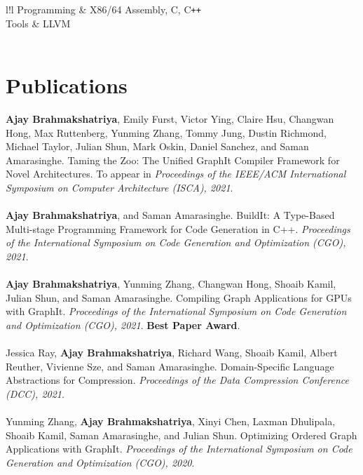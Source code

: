 \documentclass[10pt]{article}
\newcommand{\textbfx}[1]{{\bf #1}}
\newcommand{\textitx}[1]{{\it #1}}
\newcommand \VRule{}
\begin{document}
\begin{tabular}{l!{\VRule}l}
Programming		&	X86/64 Assembly, C, C\texttt{++}\\
Tools			&	LLVM\\
 \\
\end{tabular}

\section*{Publications}
\textbfx{Ajay Brahmakshatriya}, Emily Furst, Victor Ying, Claire Hsu, Changwan Hong, Max Ruttenberg, Yunming Zhang, Tommy Jung, Dustin Richmond, Michael Taylor, Julian Shun, Mark Oskin, Daniel Sanchez, and Saman Amarasinghe. Taming the Zoo: The Unified GraphIt Compiler Framework for Novel Architectures. To appear in \textitx{Proceedings of the IEEE/ACM International Symposium on Computer Architecture (ISCA), 2021}.
\\ \\
\textbfx{Ajay Brahmakshatriya}, and Saman Amarasinghe. BuildIt: A Type-Based Multi-stage Programming Framework for Code Generation in C++. 
\textitx{Proceedings of the International Symposium on Code Generation and Optimization (CGO), 2021}.
\\ \\
\textbfx{Ajay Brahmakshatriya}, Yunming Zhang, Changwan Hong, Shoaib Kamil, Julian Shun, and Saman Amarasinghe. Compiling Graph Applications for GPUs with GraphIt. 
\textitx{Proceedings of the International Symposium on Code Generation and Optimization (CGO), 2021}. \textbfx{Best Paper Award}. 
\\ \\
Jessica Ray, \textbfx{Ajay Brahmakshatriya}, Richard Wang, Shoaib Kamil, Albert Reuther, Vivienne Sze, and Saman Amarasinghe. Domain-Specific Language Abstractions for Compression.
\textitx{Proceedings of the Data Compression Conference (DCC), 2021}. 
\\ \\
Yunming Zhang, \textbfx{Ajay Brahmakshatriya}, Xinyi Chen, Laxman Dhulipala, Shoaib Kamil, Saman Amarasinghe, and Julian Shun. Optimizing Ordered Graph Applications with GraphIt. 
\textitx{Proceedings of the International Symposium on Code Generation and Optimization (CGO), 2020}. 
\end{document}
